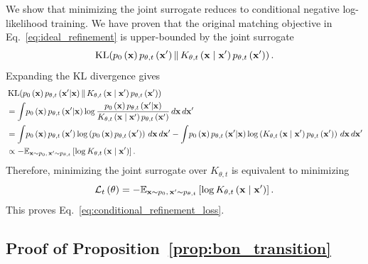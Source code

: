 We show that minimizing the joint surrogate reduces to conditional negative log-likelihood training. 
We have proven that the original matching objective in Eq.~\eqref{eq:ideal_refinement} is upper-bounded by the joint surrogate
\begin{equation*}
    \operatorname{KL}\!\left(
        p_0\left(\mathbf{x}\right)p_{\theta,t}\left(\mathbf{x}'\right)
        \,\middle\|\,
        K_{\theta,t}\left(\mathbf{x}\mid\mathbf{x}'\right)p_{\theta,t}\left(\mathbf{x}'\right)
    \right).
\end{equation*}
Expanding the KL divergence gives
\begin{align*}
    &
    \operatorname{KL}\!\left(
        p_0\left(\mathbf{x}\right)p_{\theta,t}\left(\mathbf{x}'|\mathbf{x}\right)
        \,\middle\|\,
        K_{\theta,t}\left(\mathbf{x}\mid\mathbf{x}'\right)p_{\theta,t}\left(\mathbf{x}'\right)
    \right)
    \nonumber\\
    &=
    {  \int}
    p_0\left(\mathbf{x}\right)p_{\theta,t}\left(\mathbf{x}'|\mathbf{x}\right)
    \log
    \frac{
        p_0\left(\mathbf{x}\right)p_{\theta,t}\left(\mathbf{x}'|\mathbf{x}\right)
    }{
        K_{\theta,t}\left(\mathbf{x}\mid\mathbf{x}'\right)p_{\theta,t}\left(\mathbf{x}'\right)
    }
    \,d\mathbf{x}\,d\mathbf{x}'
    \nonumber\\
    &=
    {  \int}
    p_0\left(\mathbf{x}\right)p_{\theta,t}\left(\mathbf{x}'\right)
    \log \left(p_0\left(\mathbf{x}\right)p_{\theta,t}\left(\mathbf{x}'\right)\right)
    \,d\mathbf{x}\,d\mathbf{x}'
    -
    {  \int}
    p_0\left(\mathbf{x}\right)p_{\theta,t}\left(\mathbf{x}'|\mathbf{x}\right)
    \log \left(K_{\theta,t}\left(\mathbf{x}\mid\mathbf{x}'\right)p_{\theta,t}\left(\mathbf{x}'\right)\right)
    \,d\mathbf{x}\,d\mathbf{x}'
    \nonumber\\
    &
    \propto
    -
    \mathbb{E}_{\mathbf{x}\sim p_0,\,\mathbf{x}'\sim p_{\theta,t}}
    \left[
        \log K_{\theta,t}\left(\mathbf{x}\mid\mathbf{x}'\right)
    \right].
\end{align*}
Therefore, minimizing the joint surrogate over $K_{\theta,t}$ is equivalent to minimizing
\begin{equation*}
    \mathcal{L}_{t}\left(\theta\right)
    =
    -
    \mathbb{E}_{\mathbf{x}\sim p_0,\,\mathbf{x}'\sim p_{\theta,t}}
    \left[
        \log K_{\theta,t}\left(\mathbf{x}\mid\mathbf{x}'\right)
    \right].
\end{equation*}
This proves Eq.~\eqref{eq:conditional_refinement_loss}.

\subsection{Proof of Proposition~\ref{prop:bon_transition}}
\label{app:proof_bon_transition}

